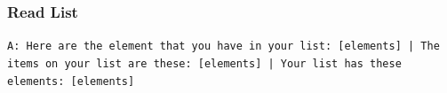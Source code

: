 \subsubsection{Read List}
\texttt{A: Here are the element that you have in your list: [elements] | The items on your list are these: [elements] | Your list has these elements: [elements]}\\

